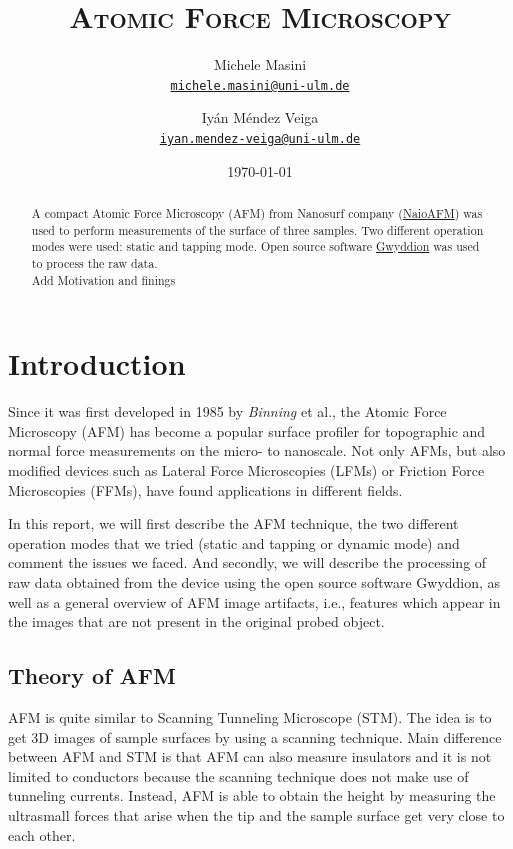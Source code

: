 \documentclass[11pt,a4paper]{article}
\title{\bfseries\textsc{Atomic Force Microscopy}}
\author{
Michele Masini\\ \small\texttt{\href{mailto:michele.masini@uni-ulm.de}{michele.masini@uni-ulm.de}}\and
Iyán Méndez Veiga\\ \small\texttt{\href{mailto:iyan.mendez-veiga@uni-ulm.de}{iyan.mendez-veiga@uni-ulm.de}}
}
\date{\today}
\begin{document}
\maketitle

\begin{abstract}
A compact Atomic Force Microscopy (AFM) from Nanosurf company (\href{https://www.nanosurf.com/en/products/naioafm-the-leading-compact-afm}{NaioAFM}) was used to perform measurements of the surface of three samples. Two different operation modes were used: static and tapping mode. Open source software \href{http://gwyddion.net/}{Gwyddion} was used to process the raw data.\\{\color{red} Add Motivation and finings}
\end{abstract}

\vspace{1.5cm}

\section{Introduction}

Since it was first developed in 1985 by \emph{Binning} et al., the Atomic Force Microscopy (AFM) \cite{Bhushan} has become a popular surface profiler for topographic and normal force measurements on the micro- to nanoscale. Not only AFMs, but also modified devices such as Lateral Force Microscopies (LFMs) or Friction Force Microscopies (FFMs), have found applications in different fields.

In this report, we will first describe the AFM technique, the two different operation modes that we tried (static and tapping or dynamic mode) and comment the issues we faced. And secondly, we will describe the processing of raw data obtained from the device using the open source software Gwyddion, as well as a general overview of AFM image artifacts, i.e., features which appear in the images that are not present in the original probed object.

\subsection{Theory of AFM}

AFM is quite similar to Scanning Tunneling Microscope (STM). The idea is to get 3D images of sample surfaces by using a scanning technique. Main difference between AFM and STM is that AFM can also measure insulators and it is not limited to conductors because the scanning technique does not make use of tunneling currents. Instead, AFM is able to obtain the height by measuring the ultrasmall forces that arise when the tip and the sample surface get very close to each other.
\end{document}
